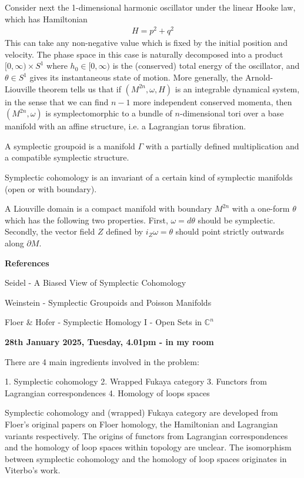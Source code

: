 \documentclass[hidelinks, 12pt]{article}
\theoremstyle{mydefstyle}
\theoremstyle{mythmstyle}
\newcounter{prop}
\begin{document}
Consider next the 1-dimensional harmonic oscillator under the linear Hooke law, which has Hamiltonian
\begin{gather*}
H = p^2 + q^2
\end{gather*}
This can take any non-negative value which is fixed by the initial position and velocity. The phase space in this case is naturally decomposed into a product $[0, \infty) \times S^1$ where $h_0 \in [0, \infty)$ is the (conserved) total energy of the oscillator, and $\theta \in S^1$ gives its instantaneous state of motion. More generally, the Arnold-Liouville theorem tells us that if $(M^{2n}, \omega, H)$ is an integrable dynamical system, in the sense that we can find $n-1$ more independent conserved momenta, then $(M^{2n}, \omega)$ is symplectomorphic to a bundle of $n$-dimensional tori over a base manifold with an affine structure, i.e. a Lagrangian torus fibration. 

A symplectic groupoid is a manifold $\Gamma$ with a partially defined multiplication and a compatible symplectic structure. 

Symplectic cohomology is an invariant of a certain kind of symplectic manifolds (open or with boundary). 

A Liouville domain is a compact manifold with boundary $M^{2n}$ with a one-form $\theta$ which has the following two properties. First, $\omega = d\theta$ should be symplectic. Secondly, the vector field $Z$ defined by $i_Z\omega = \theta$ should point strictly outwards along $\partial M$. 

\textbf{References}

Seidel - A Biased View of Symplectic Cohomology

Weinstein - Symplectic Groupoids and Poisson Manifolds

Floer \& Hofer - Symplectic Homology I - Open Sets in $\mathbb{C}^n$

\newpage

\textbf{28th January 2025, Tuesday, 4.01pm - in my room}

There are 4 main ingredients involved in the problem:

1. Symplectic cohomology
2. Wrapped Fukaya category
3. Functors from Lagrangian correspondences
4. Homology of loops spaces

Symplectic cohomology and (wrapped) Fukaya category are developed from Floer's original papers on Floer homology, the Hamiltonian and Lagrangian variants respectively. The origins of functors from Lagrangian correspondences and the homology of loop spaces within topology are unclear. The isomorphism between symplectic cohomology and the homology of loop spaces originates in Viterbo's work. 
\end{document}
